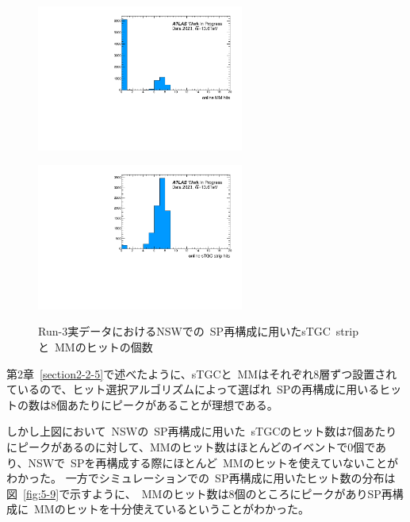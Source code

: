 \begin{figure}[H]
  \begin{minipage}[b]{0.48\linewidth}
      \centering
      \includegraphics[clip, width=6.8cm]{fig/5/data_onlinemm.pdf}
      \label{fig:5-8-1}
  \end{minipage}
    \begin{minipage}[b]{0.48\linewidth}
      \centering
      \includegraphics[clip, width=6.8cm]{fig/5/data_onlinestgceta.pdf}
      \label{fig:5-8-2}
  \end{minipage}
  \caption{Run-3実データにおけるNSWでの~SP再構成に用いたsTGC~stripと~MMのヒットの個数}
\end{figure}

第2章~\ref{section2-2-5}で述べたように、sTGCと~MMはそれぞれ8層ずつ設置されているので、ヒット選択アルゴリズムによって選ばれ~SPの再構成に用いるヒットの数は8個あたりにピークがあることが理想である。

しかし上図において~NSWの~SP再構成に用いた~sTGCのヒット数は7個あたりにピークがあるのに対して、MMのヒット数はほとんどのイベントで0個であり、NSWで~SPを再構成する際にほとんど~MMのヒットを使えていないことがわかった。
一方でシミュレーションでの~SP再構成に用いたヒット数の分布は図~\ref{fig:5-9}で示すように、~MMのヒット数は8個のところにピークがありSP再構成に~MMのヒットを十分使えているということがわかった。

